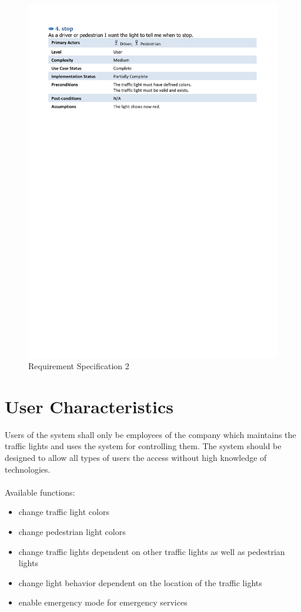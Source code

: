 \documentclass[a4paper]{report}
\begin{document}
\begin{figure}
    \includegraphics[scale=0.75]{p3}
    \caption{Requirement Specification 2}
    \label{fig:requSpec2}
\end{figure}

\newpage
\section{User Characteristics}
Users of the system shall only be employees of the company which maintains the traffic lights and uses the system for controlling them. The system should be designed to allow all types of users the access without high knowledge of technologies.\\\\
Available functions:
\begin{itemize}
    \item change traffic light colors
    \item change pedestrian light colors
    \item change traffic lights dependent on other traffic lights as well as pedestrian lights
    \item change light behavior dependent on the location of the traffic lights
    \item enable emergency mode for emergency services
\end{itemize}
\end{document}
